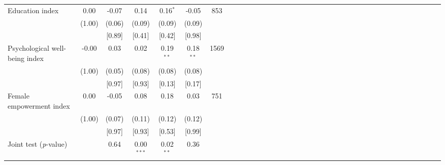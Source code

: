 {\begin{tabular}{l*{6}{SSSSSc}}
Education index&     0.00&    -0.07&     0.14&0.16$^{*}$&    -0.05&      853\\
          &   (1.00)&   (0.06)&   (0.09)&   (0.09)&   (0.09)&         \\
          &         &   [0.89]&   [0.41]&   [0.42]&   [0.98]&         \\
Psychological well-being index&    -0.00&     0.03&     0.02&0.19$^{**}$&0.18$^{**}$&     1569\\
          &   (1.00)&   (0.05)&   (0.08)&   (0.08)&   (0.08)&         \\
          &         &   [0.97]&   [0.93]&   [0.13]&   [0.17]&         \\
Female empowerment index&     0.00&    -0.05&     0.08&     0.18&     0.03&      751\\
          &   (1.00)&   (0.07)&   (0.11)&   (0.12)&   (0.12)&         \\
          &         &   [0.97]&   [0.93]&   [0.53]&   [0.99]&         \\
\midrule Joint test (\emph{p}-value)&         &     0.64&0.00$^{***}$&0.02$^{**}$&     0.36&         \\
\bottomrule
\end{tabular}
}
